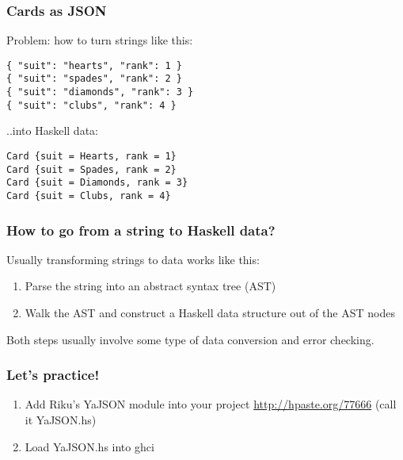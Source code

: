 \documentclass{beamer}
\begin{document}
\begin{frame}[fragile]
\frametitle{Cards as JSON}

Problem: how to turn strings like this:
\bigskip

{\small
\begin{verbatim}
{ "suit": "hearts", "rank": 1 }
{ "suit": "spades", "rank": 2 }
{ "suit": "diamonds", "rank": 3 }
{ "suit": "clubs", "rank": 4 }
\end{verbatim}
}
..into Haskell data:

{\small
\begin{verbatim}
Card {suit = Hearts, rank = 1}
Card {suit = Spades, rank = 2}
Card {suit = Diamonds, rank = 3}
Card {suit = Clubs, rank = 4}
\end{verbatim}
}

\end{frame}


\begin{frame}[fragile]
\frametitle{How to go from a string to Haskell data?}

Usually transforming strings to data works like this:
\begin{enumerate}
\item Parse the string into an abstract syntax tree (AST)
\item Walk the AST and construct a Haskell data structure out of the
  AST nodes
\end{enumerate}

Both steps usually involve some type of data conversion and error
checking.

\end{frame}


\begin{frame}[fragile]
\frametitle{Let's practice!}

\begin{enumerate}
\item Add Riku's YaJSON module into your project \href{http://hpaste.org/77666}{http://hpaste.org/77666}
(call it YaJSON.hs)
\item Load YaJSON.hs into ghci
\end{enumerate}
\end{frame}
\end{document}
